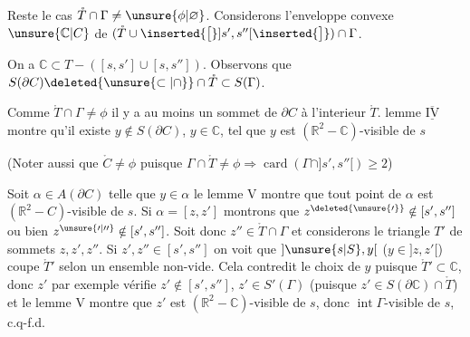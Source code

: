\margin{!!}Reste le cas $\mathring{T}\cap\Gamma\ne\unsure{\phi|\varnothing}$. Considerons l'enveloppe convexe $\unsure{\mathbb{C}|C}$ de $(\mathring{T}\cup\inserted{\bigl[}]s',s''[\inserted{\bigr]})\cap\Gamma$.

On a $\mathbb{C}\subset T-([s,s']\cup[s,s''])$. Observons que $S(\partial C)\deleted{\unsure{\subset|\cap}}\cap\mathring{T}\subset S(\Gamma)$.

Comme $\mathring{T}\cap\Gamma\ne\phi$ il y a au moins un sommet de $\partial C$ à l'interieur $\mathring{T}$.  lemme $\underline{\overline{\mathrm{IV}}}$ montre qu'il existe $y\notin S(\partial C)$, $y\in\mathbb{C}$, tel que $y$ est $(\mathbb{R}^2-\mathbb{C})$-visible de $s$

(Noter aussi que $\mathring{C}\ne\phi$ puisque $\Gamma\cap\mathring{T}\ne\phi\Rightarrow\operatorname{card}(\Gamma\cap]s',s''[)\geq 2$)

Soit $\alpha\in A(\partial C)$ telle que $y\in\alpha$ le lemme V montre que tout point de $\alpha$ est $(\mathbb{R}^2-C)$-visible de $s$. Si $\alpha=[z,z']$ montrons que $z^{\deleted{\unsure{\prime}}}\notin[s',s'']$ ou bien $z^{\unsure{\prime|\prime\prime}}\notin[s',s'']$. Soit donc $z''\in\mathring{T}\cap\Gamma$ et considerons le triangle $T'$ de sommets $z,z',z''$. Si $z',z''\in[s',s'']$ on voit que $]\unsure{s|S},y[$ ($y\in]z,z'[$) coupe $\mathring{T}'$ selon un ensemble non-vide. Cela contredit le choix de $y$ puisque $\mathring{T}'\subset\mathbb{C}$,  donc $z'$ par exemple vérifie $z'\notin[s',s'']$, $z'\in S'(\Gamma)$ (puisque $z'\in S(\partial\mathbb{C})\cap\mathring{T}$) et le lemme  V montre que $z'$ est $(\mathbb{R}^2-\mathbb{C})$-visible de $s$, donc $\operatorname{int}\Gamma$-visible de $s$, c.q-f.d.

